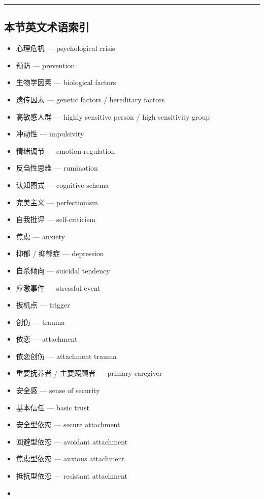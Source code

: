 \documentclass[
  chinese,
  9pt,
  a4paper,
]{ctexart}
\providecommand{\tightlist}{%
  \setlength{\itemsep}{0pt}\setlength{\parskip}{0pt}}
\begin{document}
\begin{center}\rule{0.5\linewidth}{0.5pt}\end{center}

\subsection{本节英文术语索引}\label{ux672cux8282ux82f1ux6587ux672fux8bedux7d22ux5f15-3}

\begin{itemize}
\tightlist
\item
  心理危机 --- psychological crisis
\item
  预防 --- prevention
\item
  生物学因素 --- biological factors
\item
  遗传因素 --- genetic factors / hereditary factors
\item
  高敏感人群 --- highly sensitive person / high sensitivity group
\item
  冲动性 --- impulsivity
\item
  情绪调节 --- emotion regulation
\item
  反刍性思维 --- rumination
\item
  认知图式 --- cognitive schema
\item
  完美主义 --- perfectionism
\item
  自我批评 --- self-criticism
\item
  焦虑 --- anxiety
\item
  抑郁 / 抑郁症 --- depression
\item
  自杀倾向 --- suicidal tendency
\item
  应激事件 --- stressful event
\item
  扳机点 --- trigger
\item
  创伤 --- trauma
\item
  依恋 --- attachment
\item
  依恋创伤 --- attachment trauma
\item
  重要抚养者 / 主要照顾者 --- primary caregiver
\item
  安全感 --- sense of security
\item
  基本信任 --- basic trust
\item
  安全型依恋 --- secure attachment
\item
  回避型依恋 --- avoidant attachment
\item
  焦虑型依恋 --- anxious attachment
\item
  抵抗型依恋 --- resistant attachment
\item

\end{itemize}
\end{document}
